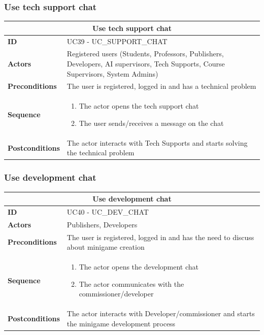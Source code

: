 \subsubsection{Use tech support chat}
\begin{tabular}{|m{2.5cm}|m{8cm}|}
	\hline
	\multicolumn{2}{|c|}{Use tech support chat} \\
	\hline
	\textbf{ID} & UC39 - UC\_SUPPORT\_CHAT \\
	\hline
	\textbf{Actors} & Registered users (Students, Professors, Publishers, Developers, AI supervisors, Tech Supports, Course Supervisors, System Admins) \\
	\hline
	\textbf{Preconditions} & The user is registered, logged in and has a technical problem \\
	\hline
	\textbf{Sequence} & 
	\begin{enumerate}
		\item The actor opens the tech support chat
		\item The user sends/receives a message on the chat
	\end{enumerate} \\
	\hline
	\textbf{Postconditions} & The actor interacts with Tech Supports and starts solving the technical problem \\
	\hline
\end{tabular}

\subsubsection{Use development chat}
\begin{tabular}{|m{2.5cm}|m{8cm}|}
	\hline
	\multicolumn{2}{|c|}{Use development chat} \\
	\hline
	\textbf{ID} & UC40 - UC\_DEV\_CHAT \\
	\hline
	\textbf{Actors} & Publishers, Developers \\
	\hline
	\textbf{Preconditions} & The user is registered, logged in and has the need to discuss about minigame creation \\
	\hline
	\textbf{Sequence} & 
	\begin{enumerate}
		\item The actor opens the development chat
		\item The actor communicates with the commissioner/developer
	\end{enumerate} \\
	\hline
	\textbf{Postconditions} & The actor interacts with Developer/commissioner and starts the minigame development process \\
	\hline
\end{tabular}

